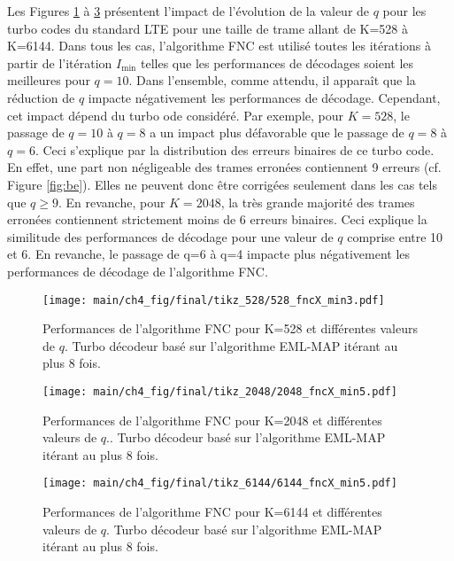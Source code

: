 Les Figures \ref{fig:fnc_min_528_q} à \ref{fig:fnc_min_6144_q} présentent l'impact de l'évolution de la valeur de $q$ 
pour les turbo codes du standard LTE pour une taille de trame allant de K=528 à K=6144. Dans tous les cas, l'algorithme 
FNC est utilisé toutes les itérations à partir de l'itération $I_\text{min}$ telles que les performances de décodages 
soient les meilleures pour $q=10$. Dans l'ensemble, comme attendu, il apparaît que la réduction de $q$ impacte 
négativement les performances de décodage. Cependant, cet impact dépend du turbo ode considéré. Par exemple, pour 
$K=528$, le passage de $q=10$ à $q=8$ a un impact plus défavorable que le passage de $q=8$ à $q=6$. Ceci s'explique par
la distribution des erreurs binaires de ce turbo code. En effet, une part non négligeable des trames erronées contiennent
9 erreurs (cf. Figure \ref{fig:be}). Elles ne peuvent donc être corrigées seulement dans les cas tels que $q\geq 9$. En 
revanche, pour $K=2048$, la très grande majorité des trames erronées contiennent strictement moins de 6 erreurs binaires.
Ceci explique la similitude des performances de décodage pour une valeur de $q$ comprise entre 10 et 6. En revanche, le 
passage de q=6 à q=4 impacte plus négativement les performances de décodage de l'algorithme FNC.  

\begin{figure}[!h]
	\centering
	\texttt{[image: main/ch4\_fig/final/tikz\_528/528\_fncX\_min3.pdf]}
	\caption{Performances de l'algorithme FNC pour K=528 et différentes valeurs de $q$. 
	Turbo décodeur basé sur l'algorithme EML-MAP itérant au plus 8 fois.
	\label{fig:fnc_min_528_q}}
\end{figure}

\begin{figure}[!h]
	\centering
	\texttt{[image: main/ch4\_fig/final/tikz\_2048/2048\_fncX\_min5.pdf]}
	\caption{Performances de l'algorithme FNC pour K=2048 et différentes valeurs de $q$..  
	Turbo décodeur basé sur l'algorithme EML-MAP itérant au plus 8 fois. 
	\label{fig:fnc_min_2048_q}}
\end{figure}

\begin{figure}[!h]
	\centering
	\texttt{[image: main/ch4\_fig/final/tikz\_6144/6144\_fncX\_min5.pdf]}
	\caption{Performances de l'algorithme FNC pour K=6144 et différentes valeurs de $q$.
	Turbo décodeur basé sur l'algorithme EML-MAP itérant au plus 8 fois.
	\label{fig:fnc_min_6144_q}}
\end{figure}


